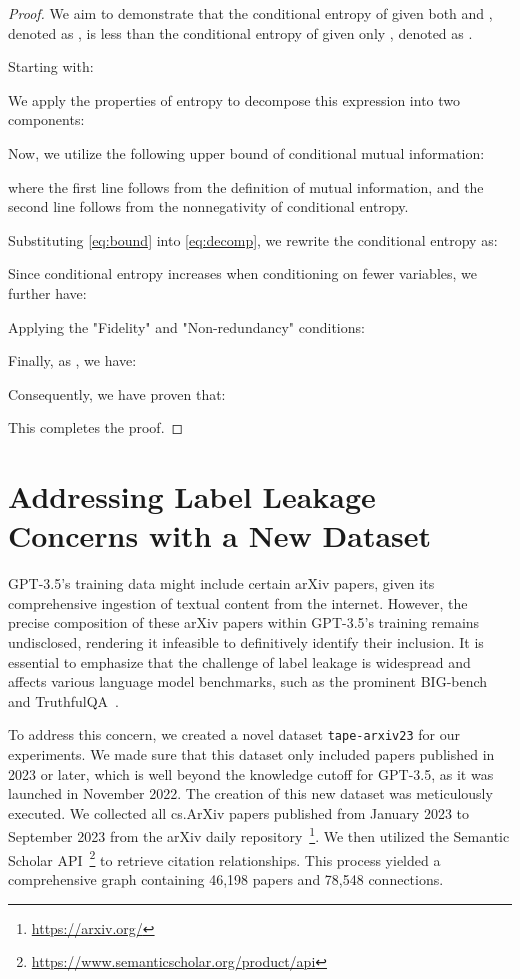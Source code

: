 \documentclass{article}
\begin{document}
\begin{proof}

We aim to demonstrate that the conditional entropy of  given both  and , denoted as , is less than the conditional entropy of  given only , denoted as . 

Starting with:


We apply the properties of entropy to decompose this expression into two components:





Now, we utilize the following upper bound of conditional mutual information:

where the first line follows from the definition of mutual information, and the second line follows from the nonnegativity of conditional entropy.

Substituting \eqref{eq:bound} into \eqref{eq:decomp}, we rewrite the conditional entropy as:


Since conditional entropy increases when conditioning on fewer variables, we further have:



Applying the "Fidelity" and "Non-redundancy" conditions:



Finally, as , we have:



Consequently, we have proven that:



This completes the proof.
\end{proof}

\section{Addressing Label Leakage Concerns with a New Dataset}\label{app: arxiv2023}

GPT-3.5's training data might include certain arXiv papers, given its comprehensive ingestion of textual content from the internet. However, the precise composition of these arXiv papers within GPT-3.5's training remains undisclosed, rendering it infeasible to definitively identify their inclusion. It is essential to emphasize that the challenge of label leakage is widespread and affects various language model benchmarks, such as the prominent BIG-bench~\citep{srivastava2022beyond_bigbench} and TruthfulQA~\citep{lin2021truthfulqa}.

To address this concern, we created a novel dataset \texttt{tape-arxiv23} for our experiments. We made sure that this dataset only included papers published in 2023 or later, which is well beyond the knowledge cutoff for GPT-3.5, as it was launched in November 2022. The creation of this new dataset was meticulously executed. We collected all cs.ArXiv papers published from January 2023 to September 2023 from the arXiv daily repository~\footnote{\url{https://arxiv.org/}}. We then utilized the Semantic Scholar API~\footnote{\url{https://www.semanticscholar.org/product/api}} to retrieve citation relationships. This process yielded a comprehensive graph containing 46,198 papers and 78,548 connections.
\end{document}
